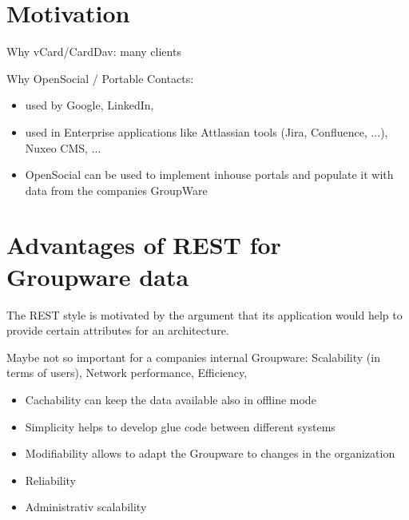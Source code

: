 \documentclass[12pt,a4paper]{scrartcl}		%
\begin{document}
\title{}
\subtitle{}
\author{Thomas Koch\\\url{thomas@koch.ro}\\matriculation number 7250371}
\publishers{Fernuniversität Hagen\\Faculty of mathematics and computer science}
\date{\today}
\maketitle{}

\tableofcontents{}
\begin{abstract}

\end{abstract}
\newpage{}

\section{Motivation}

Why vCard/CardDav: many clients

Why OpenSocial / Portable Contacts:
\begin{itemize}
\item used by Google, LinkedIn,
\item used in Enterprise applications like Attlassian tools (Jira, Confluence, ...), Nuxeo CMS, ...
\item OpenSocial can be used to implement inhouse portals and populate it with data from the companies GroupWare
\end{itemize}


\section{Advantages of REST for Groupware data}

The REST style is motivated by the argument that its application would help to provide certain attributes for an architecture.\cite[sec 5.1]{Fielding2000}

Maybe not so important for a companies internal Groupware: Scalability (in terms of users), Network performance, Efficiency, 

\begin{itemize}
\item Cachability can keep the data available also in offline mode
\item Simplicity helps to develop glue code between different systems
\item Modifiability allows to adapt the Groupware to changes in the organization
\item Reliability
\item Administrativ scalability
\end{itemize}
\end{document}
